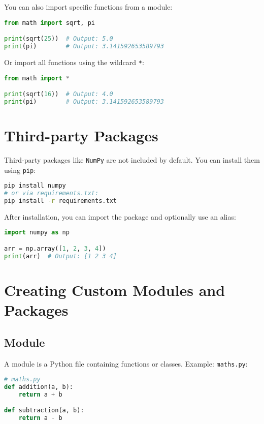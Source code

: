 You can also import specific functions from a module:

\begin{lstlisting}[language=Python]
from math import sqrt, pi

print(sqrt(25))  # Output: 5.0
print(pi)        # Output: 3.141592653589793
\end{lstlisting}

Or import all functions using the wildcard \texttt{*}:

\begin{lstlisting}[language=Python]
from math import *

print(sqrt(16))  # Output: 4.0
print(pi)        # Output: 3.141592653589793
\end{lstlisting}

\section{Third-party Packages}
Third-party packages like \texttt{NumPy} are not included by default. You can install them using \texttt{pip}:

\begin{lstlisting}[language=bash]
pip install numpy
# or via requirements.txt:
pip install -r requirements.txt
\end{lstlisting}

After installation, you can import the package and optionally use an alias:

\begin{lstlisting}[language=Python]
import numpy as np

arr = np.array([1, 2, 3, 4])
print(arr)  # Output: [1 2 3 4]
\end{lstlisting}

\section{Creating Custom Modules and Packages}

\subsection{Module}
A module is a Python file containing functions or classes. Example: \texttt{maths.py}:

\begin{lstlisting}[language=Python]
# maths.py
def addition(a, b):
    return a + b

def subtraction(a, b):
    return a - b
\end{lstlisting}

